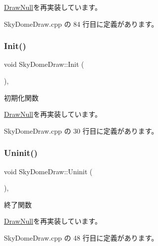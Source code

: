 \mbox{\hyperlink{class_draw_null_a001901c340671106a33d44b9d4aef4c4}{Draw\+Null}}を再実装しています。



 Sky\+Dome\+Draw.\+cpp の 84 行目に定義があります。

\mbox{\label{class_sky_dome_draw_a5b82e8b650a20dbc0b7ed720d1fb7fab}} 
\subsubsection{\texorpdfstring{Init()}{Init()}}
{\footnotesize\ttfamily void Sky\+Dome\+Draw\+::\+Init (\begin{DoxyParamCaption}{ }\end{DoxyParamCaption})\hspace{0.3cm}{\ttfamily [override]}, {\ttfamily [virtual]}}



初期化関数 



\mbox{\hyperlink{class_draw_null_acd7fef3ccea1da537ac9507ffbb6dd2e}{Draw\+Null}}を再実装しています。



 Sky\+Dome\+Draw.\+cpp の 30 行目に定義があります。

\mbox{\label{class_sky_dome_draw_aee1c6b102a97033073b2559b8c2c328b}} 
\subsubsection{\texorpdfstring{Uninit()}{Uninit()}}
{\footnotesize\ttfamily void Sky\+Dome\+Draw\+::\+Uninit (\begin{DoxyParamCaption}{ }\end{DoxyParamCaption})\hspace{0.3cm}{\ttfamily [override]}, {\ttfamily [virtual]}}



終了関数 



\mbox{\hyperlink{class_draw_null_a12d44e341c7364b5ab9cdd661dc16187}{Draw\+Null}}を再実装しています。



 Sky\+Dome\+Draw.\+cpp の 48 行目に定義があります。




